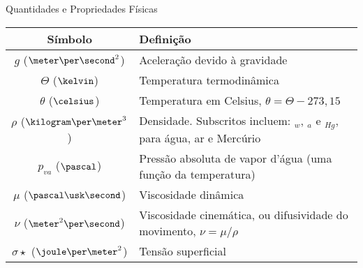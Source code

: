     \begin{frame}{Quantidades e Propriedades Físicas}\vspace*{-1em}
        \setlength{\tabcolsep}{2mm}
        \noindent\begin{longtable}{cp{110mm}}
            \alert{Símbolo} & \alert{Definição} \\
            \hline
            $g$ ($\meter\per\second^2$) &
            Aceleração devido à gravidade \\
            $\Theta$ ($\kelvin$) &
            Temperatura termodinâmica \\
            $\theta$ ($\celsius$) &
            Temperatura em Celsius, \alert{$\theta = \Theta - 273,15$} \\
            $\rho$ ($\kilogram\per\meter^3$) &
            Densidade. Subscritos incluem: \alert{$_w$}, \alert{$_a$} e \alert{$_{Hg}$}, para
            água, ar e Mercúrio \\
            $p_{va}$ ($\pascal$) &
            Pressão absoluta de vapor d'água (uma função da temperatura) \\
            $\mu$ ($\pascal\usk\second$) &
            Viscosidade dinâmica \\
            $\nu$ ($\meter^2\per\second$) &
            Viscosidade cinemática, ou difusividade do movimento, \alert{$\nu = \mu/\rho$} \\
            $\sigma\star$ ($\joule\per\meter^2$) &
            Tensão superficial \\
            \hline
        \end{longtable}
    \end{frame}

